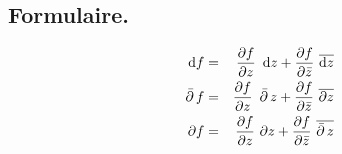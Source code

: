 \documentclass[a4paper,11pt,draft,makeidx,twocolumn]{amsart}
\begin{document}
\subsection*{Formulaire.}
\begin{eqnarray*}
\dd f & = & \dpp{f}{z}\ \dd z + \dpp{f}{\bar{z}}\ \overline{\dd z} \\
\dbarre f & = & \dpp{f}{z}\ \dbarre z + \dpp{f}{\bar{z}}\ \overline{\partial z} \\
\partial f & = & \dpp{f}{z}\ \partial z + \dpp{f}{\bar{z}}\ \overline{\dbarre z}
\end{eqnarray*}
\end{document}
